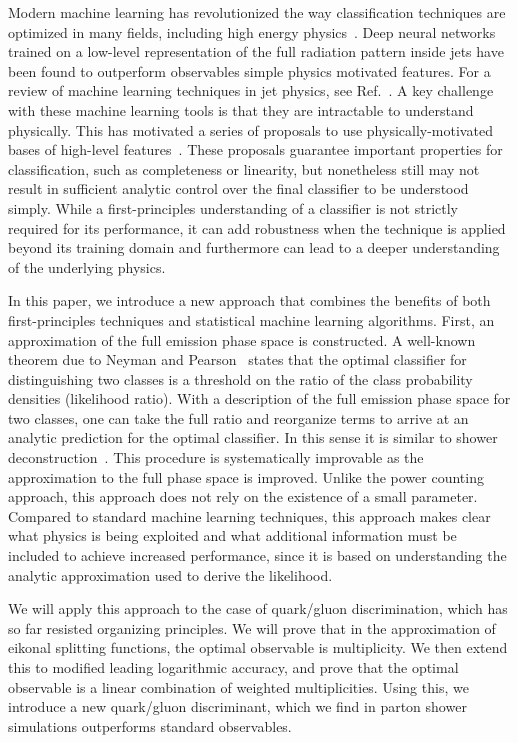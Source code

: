 \documentclass[letterpaper,11pt]{article}
\DeclareRobustCommand{\Ref}[1]{Ref.~\cite{#1}}
\begin{document}
Modern machine learning has revolutionized the way classification techniques are optimized in many fields, including high energy physics~\cite{Guest:2018yhq,Radovic:2018dip,Albertsson:2018maf}.
%
Deep neural networks trained on a low-level representation of the full radiation pattern inside jets have been found to outperform observables simple physics motivated features.
%
For a review of machine learning techniques in jet physics, see \Ref{Larkoski:2017jix}.
%
A key challenge with these machine learning tools is that they are intractable to understand physically.
%
This has motivated a series of proposals to use physically-motivated bases of high-level features~\cite{Datta:2017rhs,Datta:2017lxt,Luo:2017ncs,Komiske:2017aww}.
%
These proposals guarantee important properties for classification, such as completeness or linearity, but nonetheless still may not result in sufficient analytic control over the final classifier to be understood simply.
%
While a first-principles understanding of a classifier is not strictly required for its performance, it can add robustness when the technique is applied beyond its training domain and furthermore can lead to a deeper understanding of the underlying physics.

In this paper, we introduce a new approach that combines the benefits of both first-principles techniques and statistical machine learning algorithms.
%
First, an approximation of the full emission phase space is constructed.
%
A well-known theorem due to Neyman and Pearson~\cite{neyman1933ix} states that the optimal classifier for distinguishing two classes is a threshold on the ratio of the class probability densities (likelihood ratio).
%
With a description of the full emission phase space for two classes, one can take the full ratio and reorganize terms to arrive at an analytic prediction for the optimal classifier. In this sense it is similar to shower deconstruction~\cite{Soper:2012pb}.
%
This procedure is systematically improvable as the approximation to the full phase space is improved.
%
Unlike the power counting approach, this approach does not rely on the existence of a small parameter.
%
Compared to standard machine learning techniques, this approach makes clear what physics is being exploited and what additional information must be included to achieve increased performance, since it is based on understanding the analytic approximation used to derive the likelihood.


We will apply this approach to the case of quark/gluon discrimination, which has so far resisted organizing principles.
%
We will prove that in the approximation of eikonal splitting functions, the optimal observable is multiplicity.
%
We then extend this to modified leading logarithmic accuracy, and prove that the optimal observable is a linear combination of weighted multiplicities.
%
Using this, we introduce a new quark/gluon discriminant, which we find in parton shower simulations outperforms standard observables.
\end{document}
